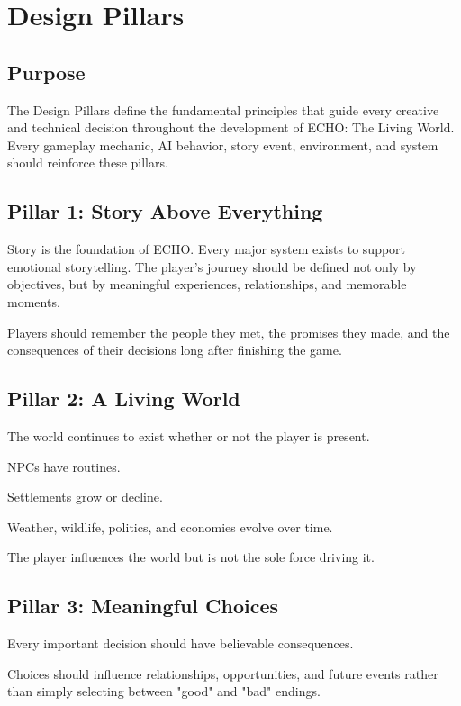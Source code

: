 \chapter{Design Pillars}

\section{Purpose}

The Design Pillars define the fundamental principles that guide every creative and technical decision throughout the development of ECHO: The Living World. Every gameplay mechanic, AI behavior, story event, environment, and system should reinforce these pillars.

\section{Pillar 1: Story Above Everything}

Story is the foundation of ECHO. Every major system exists to support emotional storytelling. The player's journey should be defined not only by objectives, but by meaningful experiences, relationships, and memorable moments.

Players should remember the people they met, the promises they made, and the consequences of their decisions long after finishing the game.

\section{Pillar 2: A Living World}

The world continues to exist whether or not the player is present.

NPCs have routines.

Settlements grow or decline.

Weather, wildlife, politics, and economies evolve over time.

The player influences the world but is not the sole force driving it.

\section{Pillar 3: Meaningful Choices}

Every important decision should have believable consequences.

Choices should influence relationships, opportunities, and future events rather than simply selecting between "good" and "bad" endings.

